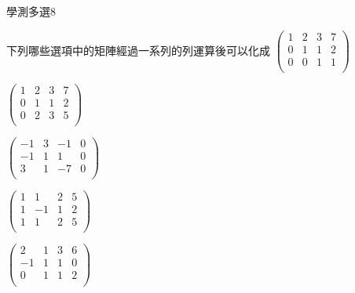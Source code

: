     \begin{QUESTION}
        \begin{ExamInfo}{96}{學測}{多選}{8}
        \end{ExamInfo}
        \begin{ExamAnsRateInfo}{30}{36}{32}{22}
        \end{ExamAnsRateInfo}
        \begin{QBODY}
            下列哪些選項中的矩陣經過一系列的列運算後可以化成
			$\left( \begin{array}{cccc} 1 & 2 & 3 & 7 \\0 & 1 & 1 & 2 \\0 & 0 & 1 & 1 \\\end{array}\right)$

			\begin{QOPS} 
				\QOP $\left( \begin{array}{cccc} 1 & 2 & 3 & 7 \\0 & 1 & 1 & 2 \\0 & 2 & 3 & 5 \\\end{array}\right)$

				\QOP $\left( \begin{array}{cccc} -1 & 3 & -1 & 0 \\-1 & 1 & 1 & 0 \\3 & 1 & -7 & 0 \\\end{array}\right)$

				\QOP $\left( \begin{array}{cccc} 1 & 1 & 2 & 5 \\1 & -1 & 1 & 2 \\1 & 1 & 2 & 5 \\\end{array}\right)$

				\QOP $\left( \begin{array}{cccc} 2 & 1 & 3 & 6 \\-1 & 1 & 1 & 0 \\0 & 1 & 1 & 2 \\\end{array}\right)$


\end{QOPS}
\end{QBODY}
\end{QUESTION}

